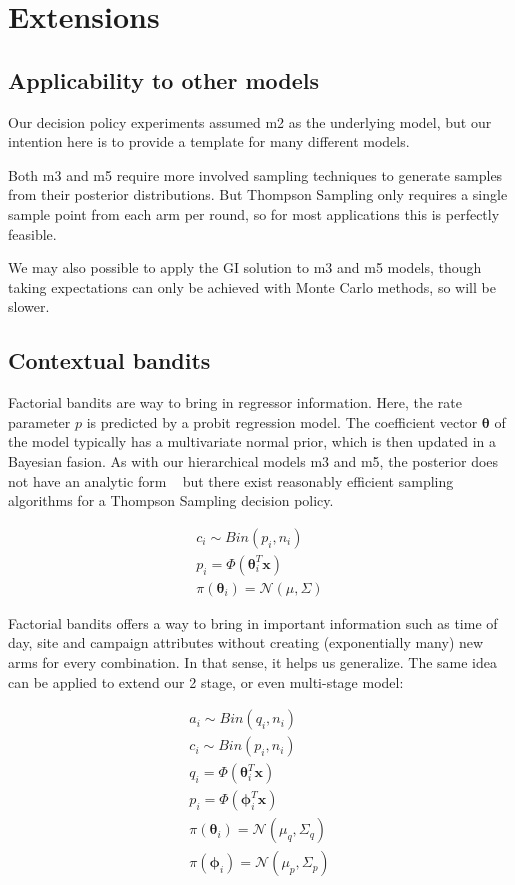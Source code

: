 \documentclass[11pt,a4,singlespacing,titlepagenumber=on]{scrreprt}
\numberwithin{equation}{chapter} %
\theoremstyle{remark}
\begin{document}
\chapter{Extensions}

\section{Applicability to other models}

Our decision policy experiments assumed m2 as the underlying model, but our intention here is to provide a template for many different models. 

Both m3 and m5 require more involved sampling techniques to generate samples from their posterior distributions. But Thompson Sampling only requires a single sample point from each arm per round, so for most applications this is perfectly feasible.

We may also possible to apply the GI solution to m3 and m5 models, though taking expectations can only be achieved with Monte Carlo methods, so will be slower.

\section{Contextual bandits}

Factorial bandits are way to bring in regressor information. Here, the rate parameter $p$ is predicted by a probit regression model. The coefficient vector $\mathbf{\theta}$ of the model typically has a multivariate normal prior, which is then updated in a Bayesian fasion. As with our hierarchical models m3 and m5, the posterior does not have an analytic form ~\cite{scott2010modern} but there exist reasonably efficient sampling algorithms for a Thompson Sampling decision policy.

\begin{align}
	c_i \sim Bin(p_i,n_i) \\
	p_i = \Phi(\mathbf{\theta}_i^T \mathbf{x}) \\
	\pi(\mathbf{\theta}_i) = \mathcal{N}(\mu,\Sigma)
\end{align}

Factorial bandits offers a way to bring in important information such as time of day, site and campaign attributes without creating (exponentially many) new arms for every combination. In that sense, it helps us generalize. The same idea can be applied to extend our 2 stage, or even multi-stage model:

\begin{align}
	a_i \sim Bin(q_i,n_i) \\
	c_i \sim Bin(p_i,n_i) \\
	q_i = \Phi(\mathbf{\theta}_i^T \mathbf{x}) \\
	p_i = \Phi(\mathbf{\phi}_i^T \mathbf{x}) \\
	\pi(\mathbf{\theta}_i) = \mathcal{N}(\mu_q,\Sigma_q) \\
	\pi(\mathbf{\phi}_i) = \mathcal{N}(\mu_p,\Sigma_p) 
\end{align}
\end{document}
